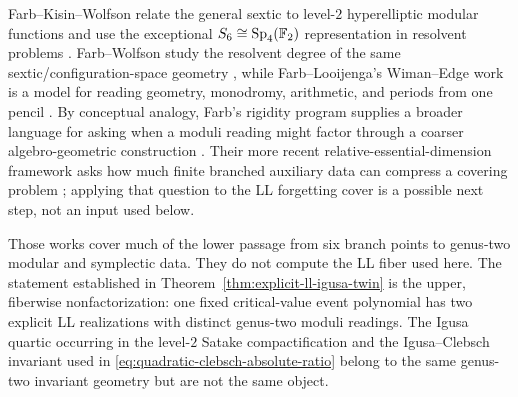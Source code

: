 \begin{remark}
\label{rem:sextic-farb-relation}
Farb--Kisin--Wolfson relate the general sextic to level-$2$
hyperelliptic modular functions and use the exceptional
$S_6\cong\operatorname{Sp}_4(\mathbb{F}_2)$ representation in resolvent problems
\cite{FarbKisinWolfson2023Modular}.  Farb--Wolfson study the resolvent degree
of the same sextic/configuration-space geometry
\cite{FarbWolfson2019Resolvent}, while Farb--Looijenga's Wiman--Edge work is a
model for reading geometry, monodromy, arithmetic, and periods from one pencil
\cite{FarbLooijenga2021WimanEdge}.  By conceptual analogy, Farb's rigidity
program supplies a broader language for asking when a moduli reading might
factor through a coarser algebro-geometric construction
\cite{Farb2024ModuliRigidity}.
Their more recent relative-essential-dimension framework asks how much finite
branched auxiliary data can compress a covering problem
\cite{FarbWolfson2025RelativeEssentialDimension}; applying that question to the
LL forgetting cover is a possible next step, not an input used below.

Those works cover much of the lower passage from six branch points to
genus-two modular and symplectic data.  They do not compute the LL fiber used
here.  The statement established in
Theorem~\ref{thm:explicit-ll-igusa-twin} is the
upper, fiberwise nonfactorization: one fixed critical-value event polynomial
has two explicit LL realizations with distinct genus-two moduli readings.  The
Igusa quartic occurring in the level-$2$ Satake compactification and the
Igusa--Clebsch invariant used in \eqref{eq:quadratic-clebsch-absolute-ratio}
belong to the same genus-two invariant geometry but are not the same object.
\end{remark}

